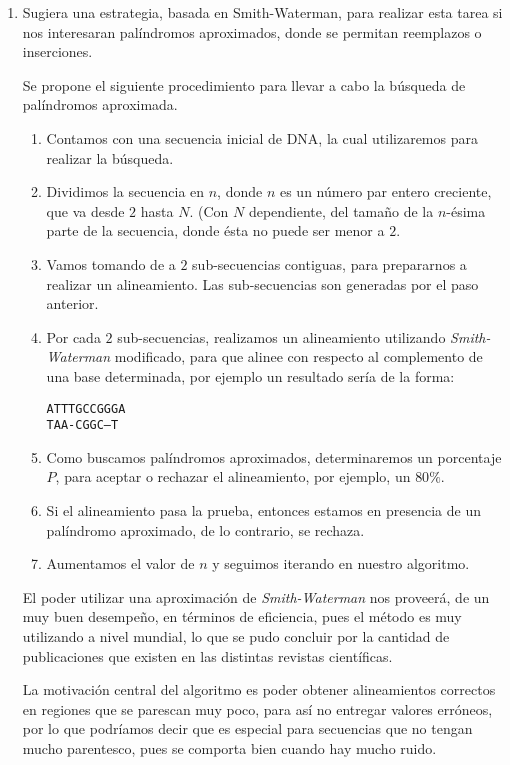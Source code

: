 \begin{enumerate}
	\item Sugiera una estrategia, basada en Smith-Waterman, para realizar esta tarea si nos interesaran
		palíndromos aproximados, donde se permitan reemplazos o inserciones.


			Se propone el siguiente procedimiento para llevar a cabo la búsqueda
			de palíndromos aproximada.

			\begin{enumerate}
				\item Contamos con una secuencia inicial de DNA, la cual utilizaremos
					para realizar la búsqueda.
				\item Dividimos la secuencia en $n$, donde $n$ es un número par entero
					creciente, que va desde $2$ hasta $N$. (Con $N$ dependiente,
					del tamaño de la $n$-ésima parte de la secuencia, donde ésta
					no puede ser menor a $2$.
				\item Vamos tomando de a $2$ sub-secuencias contiguas, para prepararnos
					a realizar un alineamiento. Las sub-secuencias son generadas por el
					paso anterior.
				\item Por cada $2$ sub-secuencias, realizamos un alineamiento utilizando
					\emph{Smith-Waterman} modificado, para que alinee con respecto al
					complemento de una base determinada, por ejemplo un resultado sería
					de la forma:
					\begin{center}	
					\texttt{ATTTGCCGGGA}\\
					\texttt{TAA-CGGC--T}\\
					\end{center}
				
				\item Como buscamos palíndromos aproximados, determinaremos un porcentaje
					$P$, para aceptar o rechazar el alineamiento, por ejemplo, un $80\%$. 
				\item Si el alineamiento pasa la prueba, entonces estamos en presencia
					de un palíndromo aproximado, de lo contrario, se rechaza.
				\item Aumentamos el valor de $n$ y seguimos iterando en nuestro algoritmo.
			\end{enumerate}
		

			El poder utilizar una aproximación de \emph{Smith-Waterman} nos proveerá,
			de un muy buen desempeño, en términos de eficiencia, pues el método es muy
			utilizando a nivel mundial, lo que se pudo concluir por la cantidad de publicaciones
			que existen en las distintas revistas científicas.

			La motivación central del algoritmo es poder obtener alineamientos correctos
			en regiones que se parescan muy poco, para así no entregar valores erróneos,
			por lo que podríamos decir que es especial para secuencias que no tengan mucho
			parentesco, pues se comporta bien cuando hay mucho ruido.
			
\end{enumerate}
